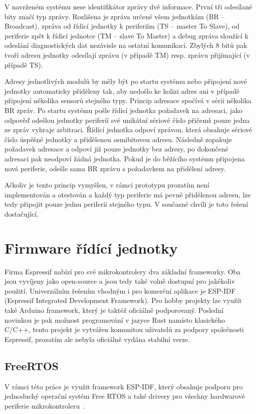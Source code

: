     V navrženém systému nese identifikátor zprávy dvě informace. První tři odesílané bity značí typ zprávy. Rozlišena je zpráva určené všem jednotkám (BR -- Broadcast), zpráva od řídicí jednotky k periferiím (TS -- master To Slave), od periferie zpět k řídicí jednotce (TM -- slave To Master) a debug zpráva sloužící k odeslání diagnostických dat nezávisle na ostatní komunikaci. Zbylých 8 bitů pak tvoří adresu jednotky odesílají zprávu (v případě TM) resp. zprávu přijímající (v případě TS). 
    
    Adresy jednotlivých modulů by měly být po startu systému nebo připojení nové jednotky automaticky přiděleny tak, aby nedošlo ke kolizi adres ani v případě připojení několika sensorů stejného typy. Princip adresace spočívá v sérii několika BR zpráv. Po startu systému pošle řídicí jednotka požadavek na adresaci, jako odpověď odešlou jednotky periferíí své unikátní sériové číslo přičemž pouze jedna ze zpráv vyhraje arbitraci. Řídící jednotka odpoví zprávou, která obsahuje sériové číslo úspěšné jednotky a přidělenou osmibitovou adresu. Následně zopakuje požadavek adresace a odpoví již pouze jednotky bez adresy, po dokončené adresaci pak neodpoví žádná jednotka. Pokud je do běžícího systému připojena nová periferie, odešle sama BR zprávu s požadavkem na přidělení adresy.

    Ačkoliv je tento princip vymyšlen, v rámci prototypu prozatím není implementován a otestován a každý typ periferie má pevně přidělenou adresu, lze tedy připojit pouze jednu periferii stejného typu. V současné chvíli je toto řešení dostačující.



\section{Firmware řídící jednotky}
    Firma Espressif nabízí pro své mikrokontrolery dva základní frameworky. Oba jsou vyvíjeny jako open-source a jsou tedy také volně dostupní pro jakékoliv použití. Univerzálním řešením vhodným i pro komerční aplikace je ESP-IDF (Espressif Integrated Development Framework). Pro hobby projekty lze využít také Arduino framework, který je taktéž oficiálně podporovaný. Poslední novinkou je pak možnost programování v jazyce Rust namísto klasického C/C++, tento projekt je vytvářen komunitou uživatelů za podpory společnosti Espressif, prozatím ale nebyla oficiálně vydána stabilní verze. 

    \subsection{FreeRTOS}
        V rámci této práce je využit framework ESP-IDF, který obsahuje podporu pro jednoduchý operační systém Free RTOS a také drivery pro všechny hardwarové periferie mikrokontroleru~\cite{espressif-idf}.

